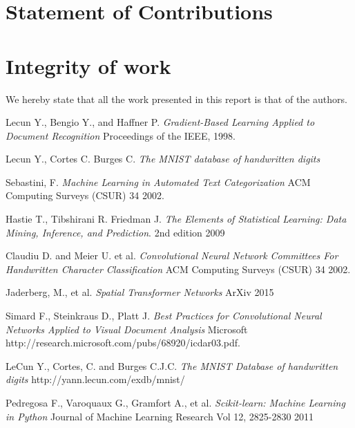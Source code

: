 \documentclass[conference]{IEEEtran}
\begin{document}
\section{Statement of Contributions}

\section{Integrity of work}
We hereby state that all the work presented in this report is that of the authors.
\begin{thebibliography}{9}

Lecun Y., Bengio Y., and Haffner P.
 \emph{Gradient-Based Learning Applied to Document Recognition}
 Proceedings of the IEEE,
 1998.

Lecun Y., Cortes C. Burges C.
\emph{The MNIST database of handwritten digits} 
 
 Sebastini, F.
  \emph{Machine Learning in Automated Text Categorization}
  ACM Computing Surveys (CSUR) 34
  2002.

 Hastie T., Tibshirani R. Friedman J.
 \emph{The Elements of 
Statistical Learning: Data Mining, Inference, and Prediction}.
2nd edition
2009


 Claudiu D. and Meier U. et al.
  \emph{Convolutional Neural Network Committees For Handwritten Character
Classification}
  ACM Computing Surveys (CSUR) 34
  2002.

 Jaderberg, M., et al.
  \emph{Spatial Transformer Networks}
  ArXiv
  2015
  
  Simard F., Steinkraus D., Platt J.
  \emph{Best Practices for Convolutional Neural Networks
Applied to Visual Document Analysis}
	Microsoft
    http://research.microsoft.com/pubs/68920/icdar03.pdf.

LeCun Y., Cortes, C. and Burges C.J.C.
	\emph{The MNIST Database of handwritten digits}
	http://yann.lecun.com/exdb/mnist/

Pedregosa F., Varoquaux G., Gramfort A., et al.
\emph{Scikit-learn: Machine Learning in {P}ython}
Journal of Machine Learning Research    
Vol 12, 2825-2830 2011   
       

\end{thebibliography}
\end{document}

